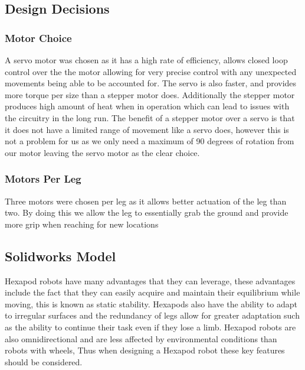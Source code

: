  




\subsection{Design Decisions}
\subsubsection{Motor Choice}
A servo motor was chosen as it has a high rate of efficiency, allows closed loop control over the the motor allowing for very precise control with any unexpected movements being able to be accounted for. The servo is also faster, and provides more torque per size than a stepper motor does. Additionally the stepper motor produces  high amount of heat when in operation which can lead to issues with the circuitry in the long run. The benefit of a stepper motor over a servo is that it does not have a limited range of movement like a servo does, however this is not a problem for us as we only need a maximum of 90 degrees of rotation from our motor leaving the servo motor as the clear choice.

\subsubsection{Motors Per Leg}
Three motors were chosen per leg as it allows better actuation of the leg than two. By doing this we allow the leg to essentially grab the ground and provide more grip when reaching for new locations

\subsection{Solidworks Model}

Hexapod robots have many advantages that they can leverage, these advantages include the fact that they can easily acquire and maintain their equilibrium while moving, this is known as static stability. Hexapods also have the ability to adapt to irregular surfaces and the redundancy of legs allow for greater adaptation such as the ability to continue their task even if they lose a limb. Hexapod robots are also omnidirectional and are less affected by environmental conditions than robots with wheels, \cite{pullteap2013development} Thus when designing a Hexapod robot these key features should be considered. 


